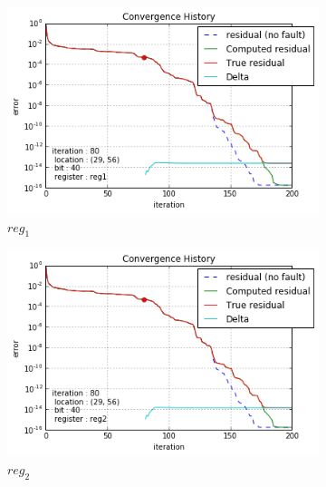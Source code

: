 \begin{figure}[h]
    \begin{minipage}[b]{0.48\linewidth}
	\begin{subfigure}[t]{\linewidth}
		\centering
		\includegraphics[width=\linewidth]{figures/gre_216a/convergence_history_register_0.png}
		\caption{$reg_1$}\label{fig:gre_216a_conv_hist_register_0}		
	\end{subfigure}
	\quad
	\begin{subfigure}[t]{\linewidth}
		\centering
		\includegraphics[width=\linewidth]{figures/gre_216a/convergence_history_register_1.png}
		\caption{$reg_2$}\label{fig:gre_216a_conv_hist_register_1}
	\end{subfigure}
    \quad
    \begin{subfigure}[t]{\linewidth}
		\centering

\end{subfigure}
\end{minipage}
\end{figure}
